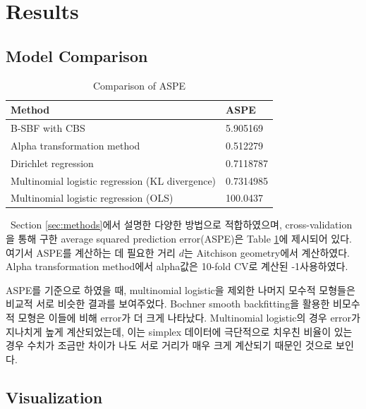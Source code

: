 \section{Results}\label{sec:results}


\subsection{Model Comparison}\label{sec:comparison}

\begin{table}[!h]
	\centering
	\begin{tabular}{ @{}ll@{}  } 
		\toprule
		Method & ASPE \\
		\midrule
		B-SBF with CBS & 5.905169 \\ 
		Alpha transformation method \citep{tsagris2015regression} & 0.512279 \\ 
		Dirichlet regression & 0.7118787 \\
		Multinomial logistic regression (KL divergence) & 0.7314985 \\
		Multinomial logistic regression (OLS) & 100.0437 \\
		\bottomrule
	\end{tabular}
	\caption{Comparison of ASPE}
	\label{table:1}
\end{table}

\ \quad Section \ref{sec:methods}에서 설명한 다양한 방법으로 적합하였으며, cross-validation을 통해 구한 average squared prediction error(ASPE)은 Table \ref{table:1}에 제시되어 있다. 여기서 ASPE를 계산하는 데 필요한 거리 $d$는 Aitchison geometry에서 계산하였다. Alpha transformation method에서 alpha값은 10-fold CV로 계산된 -1\를 사용하였다.

ASPE를 기준으로 하였을 때, multinomial logistic을 제외한 나머지 모수적 모형들은 비교적 서로 비슷한 결과를 보여주었다. Bochner smooth backfitting을 활용한 비모수적 모형은 이들에 비해 error가 더 크게 나타났다. Multinomial logistic의 경우 error가 지나치게 높게 계산되었는데, 이는 simplex 데이터에 극단적으로 치우친 비율이 있는 경우 수치가 조금만 차이가 나도 서로 거리가 매우 크게 계산되기 때문인 것으로 보인다.

\subsection{Visualization}\label{sec:visual}

